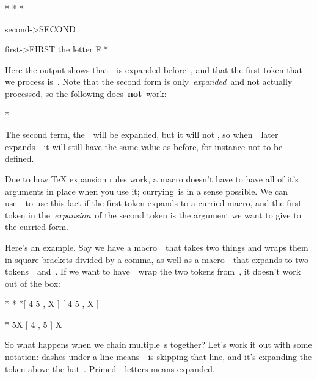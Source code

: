 {{\starttyping
*\def\first{first}
*\def\second{second}
*\expandafter\first\second
{\expandafter}

\second ->SECOND

\first ->FIRST
{the letter F}
*
\stoptyping

Here the output shows that~\type{\second}~is expanded
before~\type{\first}, and that the first token that we process
is~. Note that the second form is only~{\em expanded}~and not
actually processed, so the following does~{\bf not}~work:

\starttyping
*\expandafter\first\def\first{another first!}
\stoptyping

The second term, the~\type{\def}~will be expanded, but it will not
, so when~\type{\expandafter}~later
expands~\type{\first}~it will still have the same value as before, for
instance not to be defined.

Due to how TeX expansion rules work, a macro doesn't have to have all of
it's arguments in place when you use it;
currying~is
in a sense possible. We can use~\type{\expandafter}~to use this fact if
the first token expands to a curried macro, and the first token in
the~{\em expansion}~of the second token is the argument we want to give
to the curried form.

Here's an example. Say we have a macro~\type{\twoarray}~that takes two
things and wraps them in square brackets divided by a comma, as well as
a macro~\type{\tuple}~that expands to two tokens~~and~.
If we want to have~\type{\twoarray}~wrap the two tokens
from~\type{\tuple}, it doesn't work out of the box:

\starttyping
*\def\twoarray#1#2{[ #1 , #2 ]}
*\def\tuple{4 5}
*\twoarray\tuple X  %
[ 4 5 , X ]

*\expandafter\twoarray\tuple X
[ 4 , 5 ] X
\stoptyping

\startsectionlevel[title={Chaining},reference={chaining}]

So what happens when we chain multiple~\type{\expandafter}s together?
Let's work it out with some notation: dashes under a line
means~\type{\expandafter}~is skipping that line, and it's expanding the
token above the hat~\type{^}. Primed~~letters means expanded.

}}

